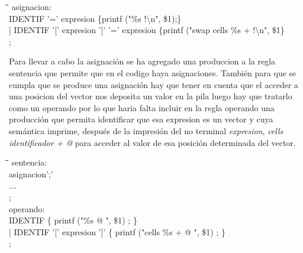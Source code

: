 \documentclass[11pt,spanish]{article}
\begin{document}
		\begin{tabbing}
			\hspace*{1cm}\=\hspace*{1cm}\= \hspace*{8cm}\=\kill
			asignacion:\\
				\>IDENTIF '=' expresion\> \>											\{printf ("\%s !\textbackslash n", \$1);\}\\
				\>| IDENTIF '[' expresion ']' '=' expresion\> \>						\{printf ("swap cells \%s + !\textbackslash n", \$1\}\\
	
			;\\
			
			
		\end{tabbing}
		Para llevar a cabo la asignación se ha agregado una produccion a la regla {\ttfamily sentencia} que permite que en el codigo haya asignaciones. También para que se cumpla que se produce una asignación hay que tener en cuenta que el acceder a una posicion del vector nos deposita un valor en la pila luego hay que tratarlo como un operando por lo que haria falta incluir en la regla {\ttfamily operando} una producción que permita identificar que esa expresion es un vector y cuya semántica imprime, después de la impresión del no terminal \textit{expresion}, \textit{cells identificador + @} para acceder al valor de esa posición determinada del vector.
		
		\begin{tabbing}
			\hspace*{1cm}\=\hspace*{1cm}\= \hspace*{4cm}\=\kill
			sentencia:\\
				\>asignacion';'\\
				\>\textit{...}\\
			;\\
			operando:\\	  
				\>IDENTIF\> \>	  		\{ printf ("\%s @ ", \$1) ; \}\\
				\>| IDENTIF '[' expresion ']'\> \> \{ printf ("cells \%s + @ ", \$1) ; \}\\
			;
		\end{tabbing}
\end{document}

